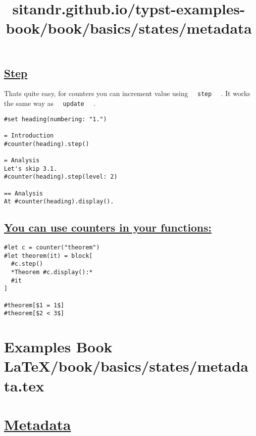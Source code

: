 \pandocbounded{}

\subsection{\texorpdfstring{\hyperref[step]{Step}}{Step}}\label{step}

That\textquotesingle s quite easy, for counters you can increment value
using \texttt{\ }{\texttt{\ step\ }}\texttt{\ } . It works the same way
as \texttt{\ }{\texttt{\ update\ }}\texttt{\ } .

\begin{verbatim}
#set heading(numbering: "1.")

= Introduction
#counter(heading).step()

= Analysis
Let's skip 3.1.
#counter(heading).step(level: 2)

== Analysis
At #counter(heading).display().
\end{verbatim}

\pandocbounded{}

\subsection{\texorpdfstring{\hyperref[you-can-use-counters-in-your-functions]{You
can use counters in your
functions:}}{You can use counters in your functions:}}\label{you-can-use-counters-in-your-functions}

\begin{verbatim}
#let c = counter("theorem")
#let theorem(it) = block[
  #c.step()
  *Theorem #c.display():*
  #it
]

#theorem[$1 = 1$]
#theorem[$2 < 3$]
\end{verbatim}

\pandocbounded{}


\section{Examples Book LaTeX/book/basics/states/metadata.tex}
\title{sitandr.github.io/typst-examples-book/book/basics/states/metadata}

\section{\texorpdfstring{\hyperref[metadata]{Metadata}}{Metadata}}\label{metadata}


